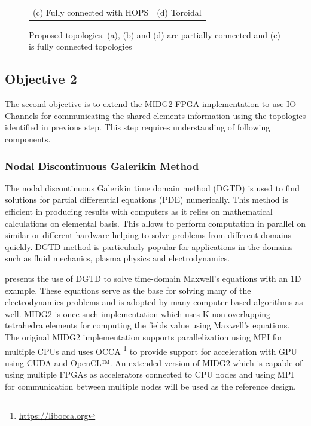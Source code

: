 \documentclass[english,notitlepage]{hgbreport}
\begin{document}
\begin{figure}[h]
\begin{tabular}{c@{\hskip 0.5in}c}
		(c) Fully connected with HOPS & (d) Toroidal
	\end{tabular}
	\caption{Proposed topologies. (a), (b) and (d) are partially connected and (c) is
	fully connected topologies} 
	\label{fig:topologies}
\end{figure}

\subsection{Objective 2}

The second objective is to extend the MIDG2 FPGA implementation to use IO Channels for communicating
the shared elements information using the topologies identified in previous step.
This step requires understanding of following components.

\subsubsection{Nodal Discontinuous Galerikin Method}	%

The nodal discontinuous Galerikin time domain method (DGTD) \cite{hesthaven_nodal_2008} is used to find solutions
for partial differential equations (PDE) numerically. This method is efficient in
producing results with computers as it relies on mathematical calculations on elemental basis.
This allows to perform computation in parallel on similar or different hardware helping to
solve problems from different domains quickly. DGTD method is particularly popular for applications
in the domains such as fluid mechanics, plasma physics and electrodynamics.

\textcite{Hesthaven_190449} presents the use of DGTD to solve time-domain Maxwell's equations with an 1D example.
These equations serve as the base for solving many of the electrodynamics problems and is adopted by
many computer based algorithms as well. MIDG2 is once such implementation which uses K non-overlapping tetrahedra elements
for computing the fields value using Maxwell's equations. The original MIDG2 implementation supports
parallelization using MPI for multiple CPUs and uses OCCA \footnote{\url{https://libocca.org}} to provide
support for acceleration with GPU using CUDA and OpenCL™. An extended version of MIDG2 which is capable of using
multiple FPGAs as accelerators connected to CPU nodes and using MPI for communication between multiple nodes will
be used as the reference design.
\end{document}
